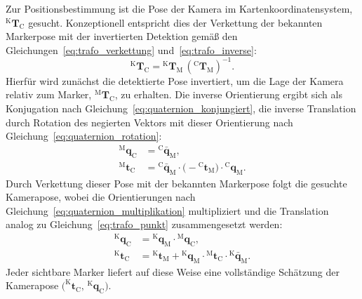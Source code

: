 Zur Positionsbestimmung  ist die Pose der Kamera im Kartenkoordinatensystem, $^{\mathrm{K}}\mathbf{T}_{\mathrm{C}}$ gesucht.
Konzeptionell entspricht dies der Verkettung der bekannten Markerpose mit der invertierten Detektion gemäß den
Gleichungen~\eqref{eq:trafo_verkettung} und~\eqref{eq:trafo_inverse}:
\begin{equation}
^{\mathrm{K}}\mathbf{T}_{\mathrm{C}} = {^{\mathrm{K}}\mathbf{T}_{\mathrm{M}}}\,\left(^{\mathrm{C}}\mathbf{T}_{\mathrm{M}}\right)^{-1}.
\label{eq:pos_kamera_in_karte}
\end{equation}
Hierfür wird zunächst die detektierte Pose invertiert, um die Lage der Kamera relativ zum Marker, $^{\mathrm{M}}\mathbf{T}_{\mathrm{C}}$, zu erhalten.
Die inverse Orientierung ergibt sich als Konjugation nach Gleichung~\eqref{eq:quaternion_konjungiert}, die inverse Translation durch Rotation
des negierten Vektors mit dieser Orientierung nach Gleichung~\eqref{eq:quaternion_rotation}:
\begin{align}
^{\mathrm{M}}\mathbf{q}_{\mathrm{C}} &= {^{\mathrm{C}}\bar{\mathbf{q}}_{\mathrm{M}}}, \label{eq:pos_inverse_q}\\
^{\mathrm{M}}\mathbf{t}_{\mathrm{C}} &= {^{\mathrm{C}}\bar{\mathbf{q}}_{\mathrm{M}}} \cdot \bigl(-{^{\mathrm{C}}\mathbf{t}_{\mathrm{M}}}\bigr) \cdot {^{\mathrm{C}}\mathbf{q}_{\mathrm{M}}}. \label{eq:pos_inverse_t}
\end{align}
Durch Verkettung dieser Pose mit der bekannten Markerpose folgt die gesuchte Kamerapose, wobei die Orientierungen nach Gleichung~\eqref{eq:quaternion_multiplikation} multipliziert und die Translation analog zu Gleichung~\eqref{eq:trafo_punkt} zusammengesetzt werden:
\begin{align}
^{\mathrm{K}}\mathbf{q}_{\mathrm{C}} &= {^{\mathrm{K}}\mathbf{q}_{\mathrm{M}}} \cdot {^{\mathrm{M}}\mathbf{q}_{\mathrm{C}}}, \label{eq:pos_kompose_q}\\
^{\mathrm{K}}\mathbf{t}_{\mathrm{C}} &= {^{\mathrm{K}}\mathbf{t}_{\mathrm{M}}} + {^{\mathrm{K}}\mathbf{q}_{\mathrm{M}}} \cdot {^{\mathrm{M}}\mathbf{t}_{\mathrm{C}}} \cdot {^{\mathrm{K}}\bar{\mathbf{q}}_{\mathrm{M}}}. \label{eq:pos_kompose_t}
\end{align}
Jeder sichtbare Marker liefert auf diese Weise eine vollständige Schätzung der Kamerapose $\bigl(^{\mathrm{K}}\mathbf{t}_{\mathrm{C}},\,{^{\mathrm{K}}\mathbf{q}_{\mathrm{C}}}\bigr)$.

